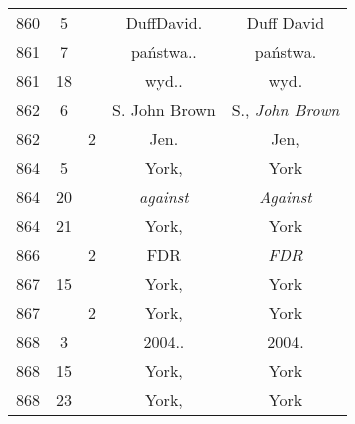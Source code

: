 \documentclass[a4paper,11pt]{article}
\begin{document}
\begin{center}
\begin{tabular}{|c|c|c|c|c|}
    860 & \hphantom{0}5 & & DuffDavid. & Duff David \\
    861 & \hphantom{0}7 & & państwa.. & państwa. \\
    861 & 18 & & wyd.. & wyd. \\
    862 & \hphantom{0}6 & & S. John Brown & S., \textit{John Brown} \\
    862 & & \hphantom{0}2 & Jen. & Jen, \\
    864 & \hphantom{0}5 & & York, & York \\
    864 & 20 & & \textit{against} & \textit{Against} \\
    864 & 21 & & York, & York \\
    866 & & \hphantom{0}2 & FDR & \textit{FDR} \\
    867 & 15 & & York, & York \\
    867 & & \hphantom{0}2 & York, & York \\
    868 & \hphantom{0}3 & & 2004.. & 2004. \\
    868 & 15 & & York, & York \\
    868 & 23 & & York, & York \\
    \hline
  \end{tabular}





  \newpage


\end{center}
\end{document}
